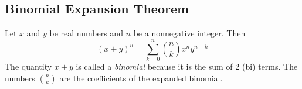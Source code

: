 \subsection{Binomial Expansion Theorem} \label{sec:binExp}

Let $x$ and $y$ be real numbers and $n$ be a nonnegative integer. Then 
\begin{equation*}
    (x + y)^n = \sum_{k = 0}^n \binom{n}{k} x^n y^{n - k}
\end{equation*}
The quantity $x + y$ is called a \textit{binomial} because it is the sum of 2 (bi) terms. The numbers $\binom{n}{k}$ are the coefficients of the expanded binomial.